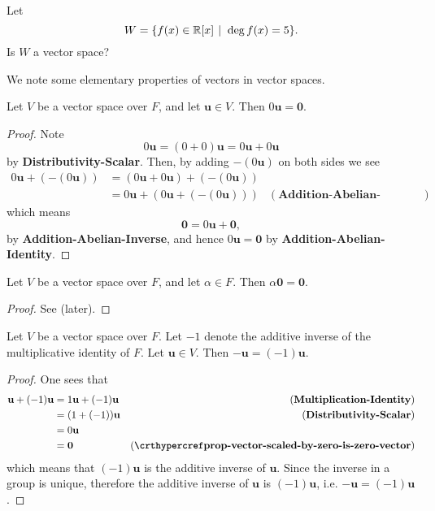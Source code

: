 \begin{exercise}
    Let
    \[
        W = \{f(x) \in \R[x] \vert \deg f(x) = 5\}.
    \]
    Is $W$ a vector space?
\end{exercise}

We note some elementary properties of vectors in vector spaces.
\begin{proposition}\label{prop-vector-scaled-by-zero-is-zero-vector}
    Let $V$ be a vector space over $F$, and let $\textbf{u} \in V$. Then $0\textbf{u} = \textbf{0}$.
\end{proposition}
\begin{proof}
    Note
    \[
        0\textbf{u} = (0 + 0)\textbf{u} = 0\textbf{u} + 0\textbf{u}
    \]
    by \textbf{Distributivity-Scalar}. Then, by adding $-(0\textbf{u})$ on both sides we see
    \begin{align*}
        0\textbf{u} + (-(0\textbf{u})) &= (0\textbf{u} + 0\textbf{u}) + (-(0\textbf{u}))\\
        &= 0\textbf{u} + (0\textbf{u} + (-(0\textbf{u}))) & (\textbf{Addition-Abelian-Associativity})
    \end{align*}
    which means
    \[
        \textbf{0} = 0\textbf{u} + \textbf{0},
    \]
    by \textbf{Addition-Abelian-Inverse}, and hence $0\textbf{u} = \textbf{0}$ by \textbf{Addition-Abelian-Identity}.
\end{proof}

\begin{proposition}\label{prop-zero-vector-scaled-by-constant-is-zero-vector}
    Let $V$ be a vector space over $F$, and let $\alpha \in F$. Then $\alpha\textbf{0} = \textbf{0}$.
\end{proposition}
\begin{proof}
    See  (later).
\end{proof}

\begin{proposition}\label{prop-vector-inverse-is-negative-vector}
    Let $V$ be a vector space over $F$. Let $-1$ denote the additive inverse of the multiplicative identity of $F$. Let $\textbf{u} \in V$. Then $-\textbf{u} = (-1)\textbf{u}$.
\end{proposition}
\begin{proof}
    One sees that
    \begin{align*}
        \textbf{u} + (-1)\textbf{u} &= 1\textbf{u} + (-1)\textbf{u} & (\textbf{Multiplication-Identity})\\
        &= (1 + (-1))\textbf{u} & (\textbf{Distributivity-Scalar})\\
        &= 0\textbf{u}\\
        &= \textbf{0} & (\myref{prop-vector-scaled-by-zero-is-zero-vector})
    \end{align*}
    which means that $(-1)\textbf{u}$ is the additive inverse of $\textbf{u}$. Since the inverse in a group is unique, therefore the additive inverse of $\textbf{u}$ is $(-1)\textbf{u}$, i.e. $-\textbf{u} = (-1)\textbf{u}$.
\end{proof}

